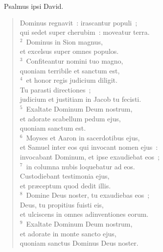~\lettrine[lines=10,image=true,loversize=0.05,lraise=-0.03]{P}{}salmus ipsi David. \begin{flushleft}\begin{verse}\vspace{6pt}Dominus regnavit~: irascantur populi~;\\ qui sedet super cherubim~: moveatur terra.\\
${}^{2}$~Dominus in Sion magnus,\\ et excelsus super omnes populos.\\
${}^{3}$~Confiteantur nomini tuo magno,\\ quoniam terribile et sanctum est,\\
${}^{4}$~et honor regis judicium diligit.\\ Tu parasti directiones~;\\ judicium et justitiam in Jacob tu fecisti.\\
${}^{5}$~Exaltate Dominum Deum nostrum,\\ et adorate scabellum pedum ejus,\\ quoniam sanctum est.\\
${}^{6}$~Moyses et Aaron in sacerdotibus ejus,\\ et Samuel inter eos qui invocant nomen ejus~:\\ invocabant Dominum, et ipse exaudiebat eos~;\\
${}^{7}$~in columna nubis loquebatur ad eos.\\ Custodiebant testimonia ejus,\\ et pr\ae ceptum quod dedit illis.\\
${}^{8}$~Domine Deus noster, tu exaudiebas eos~;\\ Deus, tu propitius fuisti eis,\\ et ulciscens in omnes adinventiones eorum.\\
${}^{9}$~Exaltate Dominum Deum nostrum,\\ et adorate in monte sancto ejus,\\ quoniam sanctus Dominus Deus noster.\end{verse}\end{flushleft}


